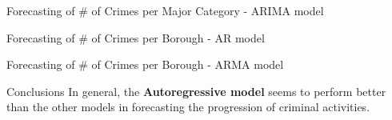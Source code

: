 \documentclass[12pt]{beamer}
\begin{document}
        \begin{frame}{Forecasting of \# of Crimes per Major Category - ARIMA model}
            \begin{figure}
                \centering
            \end{figure}
        \end{frame}

        \begin{frame}{Forecasting of \# of Crimes per Borough - AR model}
            \begin{figure}
                \centering
            \end{figure}
        \end{frame}

        \begin{frame}{Forecasting of \# of Crimes per Borough - ARMA model}
            \begin{figure}
                \centering
            \end{figure}
        \end{frame}

        \begin{frame}{Conclusions}
            In general, the \textbf{Autoregressive model} seems to perform better than the other models in
            forecasting the progression of criminal activities.
        \end{frame}
\end{document}
